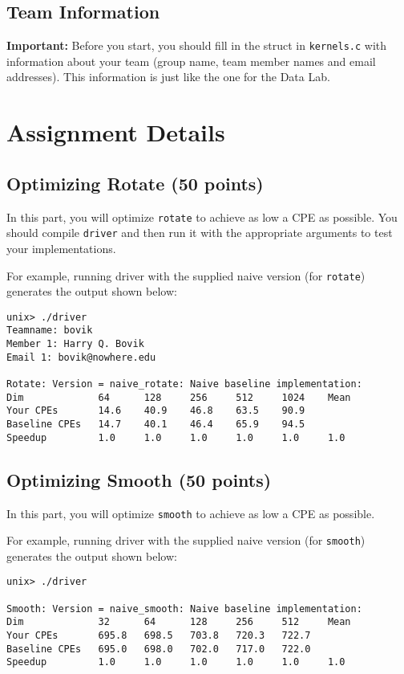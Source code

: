 \documentclass[11pt]{article}
\begin{document}
\subsection*{Team Information}
{\bf Important:} Before you start, you should fill in the struct in
{\tt kernels.c} with information about your team (group name, team
member names and email addresses). This information is just like the
one for the Data Lab. 

\section{Assignment Details}

\subsection*{Optimizing Rotate (50 points)}
In this part, you will optimize {\tt rotate} to achieve as low a CPE
as possible.  You should compile {\tt driver} and then run it with the
appropriate arguments to test your implementations.

For example, running driver with the supplied naive version (for 
{\tt rotate}) generates the output shown below:
\small{\begin{verbatim}
unix> ./driver
Teamname: bovik
Member 1: Harry Q. Bovik
Email 1: bovik@nowhere.edu

Rotate: Version = naive_rotate: Naive baseline implementation:
Dim             64      128     256     512     1024    Mean
Your CPEs       14.6    40.9    46.8    63.5    90.9
Baseline CPEs   14.7    40.1    46.4    65.9    94.5
Speedup         1.0     1.0     1.0     1.0     1.0     1.0
\end{verbatim}}

\subsection*{Optimizing Smooth (50 points)}
In this part, you will optimize {\tt smooth} to achieve as low a CPE
as possible. 

For example, running driver with the supplied naive version (for
{\tt smooth}) generates the output shown below:
\small{\begin{verbatim}
unix> ./driver

Smooth: Version = naive_smooth: Naive baseline implementation:
Dim             32      64      128     256     512     Mean
Your CPEs       695.8   698.5   703.8   720.3   722.7
Baseline CPEs   695.0   698.0   702.0   717.0   722.0
Speedup         1.0     1.0     1.0     1.0     1.0     1.0
\end{verbatim}}
\end{document}
